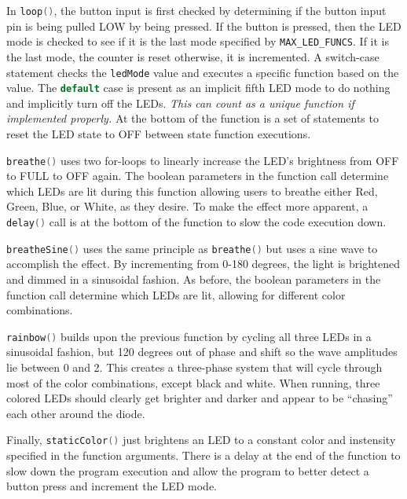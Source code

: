 \documentclass{article}
\begin{document}
    In \lstinline[language=C++, style=mystyle]{loop()}, the button input is first checked by determining if the button input pin is being pulled LOW by being pressed.
    If the button is pressed, then the LED mode is checked to see if it is the last mode specified by \lstinline[language=C++, style=mystyle]{MAX_LED_FUNCS}.
    If it is the last mode, the counter is reset otherwise, it is incremented.
    A switch-case statement checks the \lstinline[language=C++, style=mystyle]{ledMode} value and executes a specific function based on the value. The \lstinline[language=C++, style=mystyle]{default} case is present as an implicit fifth LED mode to do nothing and implicitly turn off the LEDs. 
    \emph{This can count as a unique function if implemented properly.}
    At the bottom of the function is a set of statements to reset the LED state to OFF between state function executions.
    
    \lstinline[language=C++, style=mystyle]{breathe()} uses two for-loops to linearly increase the LED's brightness from OFF to FULL to OFF again.
    The boolean parameters in the function call determine which LEDs are lit during this function allowing users to breathe either Red, Green, Blue, or White, as they desire.
    To make the effect more apparent, a \lstinline[language=C++, style=mystyle]{delay()} call is at the bottom of the function to slow the code execution down.

    \lstinline[language=C++, style=mystyle]{breatheSine()} uses the same principle as \lstinline[language=C++, style=mystyle]{breathe()} but uses a sine wave to accomplish the effect.
    By incrementing from 0-180 degrees, the light is brightened and dimmed in a sinusoidal fashion.
    As before, the boolean parameters in the function call determine which LEDs are lit, allowing for different color combinations.

    \lstinline[language=C++, style=mystyle]{rainbow()} builds upon the previous function by cycling all three LEDs in a sinusoidal fashion, but 120 degrees out of phase and shift so the wave amplitudes lie between 0 and 2.
    This creates a three-phase system that will cycle through most of the color combinations, except black and white.
    When running, three colored LEDs should clearly get brighter and darker and appear to be ``chasing'' each other around the diode.

    Finally, \lstinline[language=C++, style=mystyle]{staticColor()} just brightens an LED to a constant color and instensity specified in the function arguments.
    There is a delay at the end of the function to slow down the program execution and allow the program to better detect a button press and increment the LED mode.

    \pagebreak
    
\end{document}
